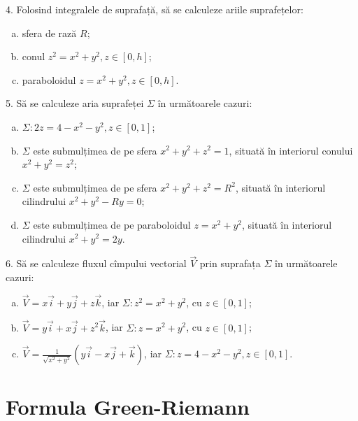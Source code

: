 \documentclass[11pt,a4paper]{article}
\theoremstyle{dotless}
\theoremstyle{dotlessdr}
\begin{document}
\vspace{1cm}

4. Folosind integralele de suprafață, să se calculeze ariile suprafețelor:
\begin{enumerate}[(a)]
\item sfera de rază $R$;
\item conul $z^2 = x^2 + y^2, z \in [0, h]$;
\item paraboloidul $z = x^2 + y^2, z \in [0, h]$.
\end{enumerate}

\vspace{1cm}

5. Să se calculeze aria suprafeței $\Sigma$ în următoarele cazuri:
\begin{enumerate}[(a)]
\item $\Sigma : 2z = 4 - x^2 - y^2, z \in [0, 1]$;
\item $\Sigma$ este submulțimea de pe sfera $x^2 + y^2 + z^2 = 1$, situată în interiorul
  conului $x^2 + y^2 = z^2$;
\item $\Sigma$ este submulțimea de pe sfera $x^2 + y^2 + z^2 = R^2$, situată în interiorul
  cilindrului $x^2 + y^2 - Ry = 0$;
\item $\Sigma$ este submulțimea de pe paraboloidul $z = x^2 + y^2$, situată în interiorul
  cilindrului $x^2 + y^2 = 2y$.
\end{enumerate}

\vspace{1cm}

6. Să se calculeze fluxul cîmpului vectorial $\vec{V}$ prin suprafața $\Sigma$
în următoarele cazuri:
\begin{enumerate}[(a)]
\item $\vec{V} = x\vec{i} + y\vec{j} + z \vec{k}$, iar $\Sigma: z^2 = x^2 + y^2$,
  cu $z \in [0, 1]$;
\item $\vec{V} = y\vec{i} + x \vec{j} + z^2 \vec{k}$, iar $\Sigma: z = x^2 + y^2$, cu
  $z \in [0, 1]$;
\item $\vec{V} = \frac{1}{\sqrt{x^2 + y^2}} (y\vec{i} - x \vec{j} + \vec{k})$, iar
  $\Sigma: z = 4 - x^2 - y^2, z \in [0, 1]$.
\end{enumerate}



\section{Formula Green-Riemann}
\label{sec:g-r}
\end{document}
